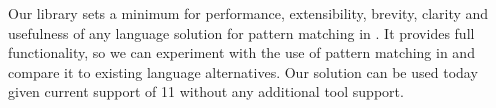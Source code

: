 

\noindent
Our library sets a minimum for performance, extensibility, brevity, 
clarity and usefulness of any language solution for pattern matching 
in \Cpp{}. It provides full functionality, so we can experiment with the use of 
pattern matching in \Cpp{} and compare it to existing language alternatives.
Our solution can be used today given current support of \Cpp{}11 without any 
additional tool support.

